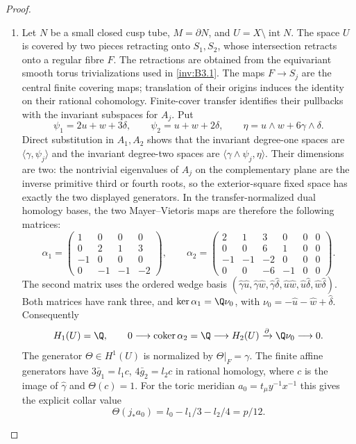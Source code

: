 \begin{proof}
\begin{enumerate}[label=\arabic*.,leftmargin=*]
\item Let $N$ be a small closed cusp tube, $M=\partial N$, and
$U=X\setminus\operatorname{int}N$. The space $U$ is covered by
two pieces retracting onto $S_1,S_2$, whose intersection retracts
onto a regular fibre $F$. The retractions are obtained from the
equivariant smooth torus trivializations used in \ref{inv:B3.1}. The maps
$F\to S_j$ are the central finite covering maps; translation of
their origins induces the identity on their rational cohomology.
Finite-cover transfer identifies their pullbacks with the invariant
subspaces for $A_j$. Put
\[
 \psi_1=2u+w+3\delta,\qquad \psi_2=u+w+2\delta,
 \qquad \eta=u\wedge w+6\gamma\wedge\delta.
\]
Direct substitution in $A_1,A_2$ shows that the invariant
degree-one spaces are $\langle\gamma,\psi_j\rangle$ and the
invariant degree-two spaces are
$\langle\gamma\wedge\psi_j,\eta\rangle$.
Their dimensions are two: the nontrivial eigenvalues of $A_j$ on
the complementary plane are the inverse primitive third or fourth
roots, so the exterior-square fixed space has exactly the two
displayed generators.
In the transfer-normalized dual homology bases, the two
Mayer--Vietoris maps are therefore the following matrices:
\[
 \alpha_1=\begin{pmatrix}
 1&0&0&0\\0&2&1&3\\-1&0&0&0\\0&-1&-1&-2
 \end{pmatrix},\qquad
 \alpha_2=\begin{pmatrix}
 2&1&3&0&0&0\\0&0&6&1&0&0\\
 -1&-1&-2&0&0&0\\0&0&-6&-1&0&0
 \end{pmatrix}.
\]
The second matrix uses the ordered wedge basis
$(\hat\gamma\hat u,\hat\gamma\hat w,\hat\gamma\hat\delta,
\hat u\hat w,\hat u\hat\delta,\hat w\hat\delta)$.
Both matrices have rank three, and
$\ker\alpha_1=\Q\nu_0$, with
$\nu_0=-\hat u-\hat w+\hat\delta$.
Consequently
\begin{equation}
 H_1(U)=\Q,\qquad
 0\longrightarrow\operatorname{coker}\alpha_2=\Q
 \longrightarrow H_2(U)
 \xrightarrow{\partial}\Q\nu_0\longrightarrow0.
\label{pub:I:eq:B-1}
\end{equation}
The generator $\Theta\in H^1(U)$ is normalized by
$\Theta|_F=\gamma$. The finite affine generators have
$3\bar g_1=l_1c$, $4\bar g_2=l_2c$ in rational homology, where
$c$ is the image of $\hat\gamma$ and $\Theta(c)=1$.
For the toric meridian $a_0=t_\mu y^{-1}x^{-1}$ this gives the
explicit collar value
\begin{equation}
 \Theta(j_*a_0)=l_0-l_1/3-l_2/4=p/12.
\label{pub:I:eq:B-2}
\end{equation}


\end{enumerate}
\end{proof}
